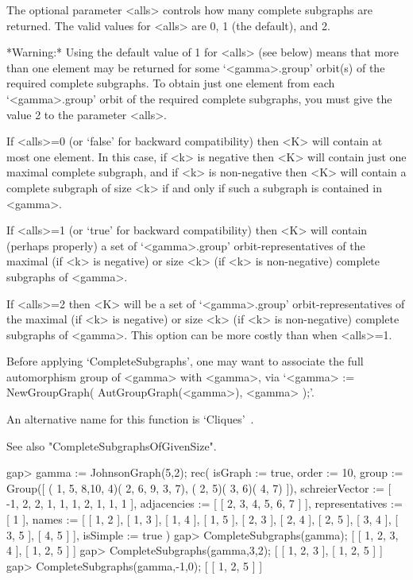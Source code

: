 The optional parameter <alls> controls how many complete subgraphs are
returned. The valid values for <alls> are 0, 1 (the default), and 2.

*Warning:* Using the default value of 1 for <alls> (see below) means that
more than one element may be returned for some `<gamma>.group' orbit(s)
of the required complete subgraphs.  To obtain just one element from each
`<gamma>.group' orbit of the required complete subgraphs, you must give
the value 2 to the parameter <alls>.

If <alls>=0 (or `false' for backward compatibility) then <K> will contain
at most one element. In this case, if <k> is negative then <K> will
contain just one maximal complete subgraph, and if <k> is non-negative
then <K> will contain a complete subgraph of size <k> if and only if
such a subgraph is contained in <gamma>.

If <alls>=1 (or `true' for backward compatibility) then <K> will contain
(perhaps properly) a set of `<gamma>.group' orbit-representatives of
the maximal (if <k> is negative) or size <k> (if <k> is non-negative)
complete subgraphs of <gamma>.

If <alls>=2 then <K> will be a set of `<gamma>.group'
orbit-representatives of the maximal (if <k> is negative) or size <k>
(if <k> is non-negative) complete subgraphs of <gamma>.  This option
can be more costly than when <alls>=1.

Before applying `CompleteSubgraphs', one may want to associate the full
automorphism group of <gamma> with <gamma>, via `<gamma> :=
NewGroupGraph( AutGroupGraph(<gamma>), <gamma> );'.

An alternative name for this function is `Cliques'~.

See also "CompleteSubgraphsOfGivenSize".

\beginexample
gap> gamma := JohnsonGraph(5,2);
rec( isGraph := true, order := 10, 
  group := Group([ ( 1, 5, 8,10, 4)( 2, 6, 9, 3, 7), ( 2, 5)( 3, 6)( 4, 7) ]),
  schreierVector := [ -1, 2, 2, 1, 1, 1, 2, 1, 1, 1 ], 
  adjacencies := [ [ 2, 3, 4, 5, 6, 7 ] ], representatives := [ 1 ], 
  names := [ [ 1, 2 ], [ 1, 3 ], [ 1, 4 ], [ 1, 5 ], [ 2, 3 ], [ 2, 4 ], 
      [ 2, 5 ], [ 3, 4 ], [ 3, 5 ], [ 4, 5 ] ], isSimple := true )
gap> CompleteSubgraphs(gamma);
[ [ 1, 2, 3, 4 ], [ 1, 2, 5 ] ]
gap>  CompleteSubgraphs(gamma,3,2);
[ [ 1, 2, 3 ], [ 1, 2, 5 ] ]
gap> CompleteSubgraphs(gamma,-1,0);
[ [ 1, 2, 5 ] ]
\endexample


